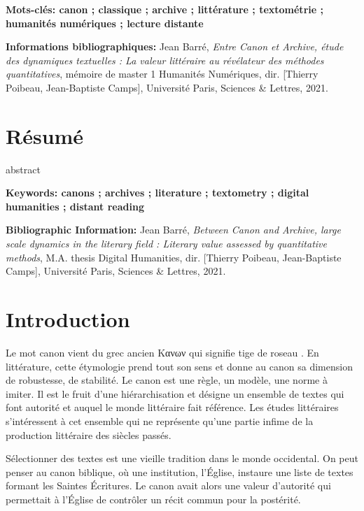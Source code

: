 \documentclass[a4paper,twoside,12pt]{book}
\begin{document}
\medskip

\textbf{Mots-clés: canon ; classique ; archive ; littérature ; textométrie ; humanités numériques ; lecture distante}

\textbf{Informations bibliographiques:} Jean Barré, \textit{Entre Canon et Archive, étude des dynamiques textuelles : La valeur littéraire au révélateur des méthodes quantitatives}, mémoire de master 1 \og Humanités Numériques\fg{}, dir. [Thierry Poibeau, Jean-Baptiste Camps], Université Paris, Sciences \& Lettres, 2021.


\section*{Résumé}

abstract

\medskip

\textbf{Keywords: canons ; archives ; literature ; textometry ; digital humanities ; distant reading}

\textbf{Bibliographic Information:} Jean Barré, \textit{Between Canon and Archive, large scale dynamics in the literary field : Literary value assessed by quantitative methods}, M.A. thesis \og Digital Humanities\fg{}, dir. [Thierry Poibeau, Jean-Baptiste Camps], Université Paris, Sciences \& Lettres, 2021.



\mainmatter

\newpage

\tableofcontents

\newpage

\section*{Introduction}
Le mot canon vient du grec ancien \foreignlanguage{greek}{Κανων} qui signifie \og tige de roseau \fg. En littérature, cette étymologie prend tout son sens et donne au canon sa dimension de robustesse, de stabilité. Le canon est une règle, un modèle, une norme à imiter. Il est le fruit d'une hiérarchisation et désigne un ensemble de textes qui font autorité et auquel le monde littéraire fait référence. Les études littéraires s'intéressent à cet ensemble qui ne représente qu'une partie infime de la production littéraire des siècles passés.

Sélectionner des textes est une vieille tradition dans le monde occidental. On peut penser au canon biblique, où une institution, l'Église, instaure une liste de textes formant les Saintes Écritures. Le canon avait alors une valeur d'autorité qui permettait à l'Église de contrôler un récit commun pour la postérité.
\end{document}
